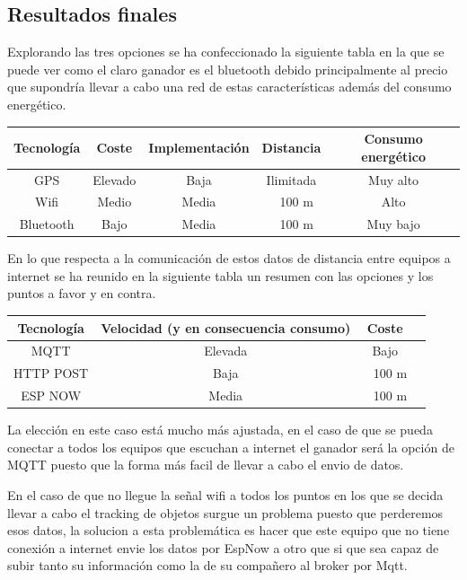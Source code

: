 \documentclass[a4paper ,12pt, onecolumn]{article}
\begin{document}
    \subsection{Resultados finales}
        Explorando las tres opciones se ha confeccionado la siguiente tabla en la que se puede ver como el claro ganador es el  bluetooth debido 
        principalmente al precio que supondría llevar a cabo una red de estas características además del consumo energético.
        \begin{center}
            \begin{tabular}{||c | c| c| c| c ||} 
            \hline
            Tecnología  & Coste  & Implementación & Distancia & Consumo energético \\ [0.5ex] 
            \hline
            GPS& Elevado& Baja & Ilimitada& Muy alto\\
            Wifi& Medio& Media & ~ 100 m & Alto\\ 
            Bluetooth& Bajo& Media & ~ 100 m & Muy bajo\\ 
            \hline
            \end{tabular}
        \end{center}   
        En lo que respecta a la comunicación de estos datos de distancia entre equipos a internet se ha reunido en la 
        siguiente tabla un resumen con las opciones y los puntos a favor y en contra.
        \begin{center}
            \begin{tabular}{||c | c| c| c||} 
            \hline
            Tecnología  & Velocidad (y en consecuencia consumo) & Coste \\ [0.5ex] 
            \hline
            MQTT& Elevada  & Bajo\\
            HTTP POST& Baja & ~ 100 m \\ 
            ESP NOW& Media & ~ 100 m \\ 
            \hline
            \end{tabular}
        \end{center}   
        La elección en este caso está mucho más ajustada, en el caso de que se pueda conectar a todos los equipos que 
        escuchan a internet el ganador será la opción de MQTT puesto que la forma más facil de llevar a cabo el envio de datos.

        En el caso de que no llegue la señal wifi a todos los puntos en los que se decida llevar a cabo el tracking de objetos 
        surgue un problema puesto que perderemos esos datos, la solucion a esta problemática es hacer que este equipo que no 
        tiene conexión a internet envie los datos por EspNow a otro que si que sea capaz de subir tanto su información como la 
        de su compañero al broker por Mqtt.
\end{document}
